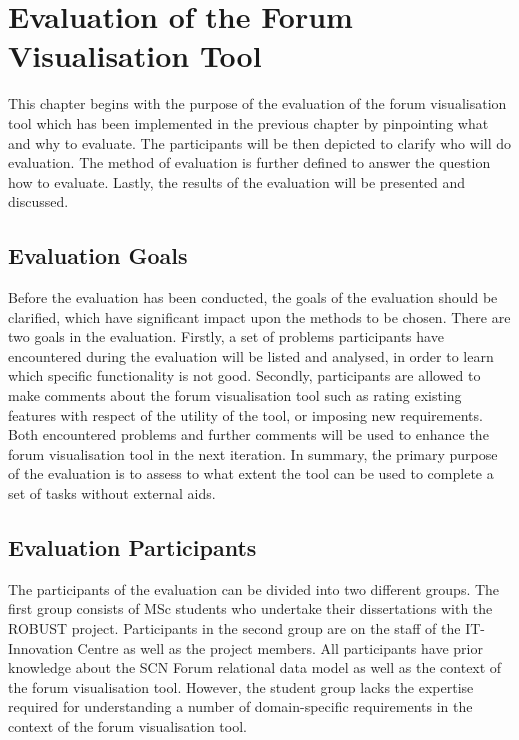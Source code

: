 \chapter{Evaluation of the Forum Visualisation Tool} \label{Chapter:Evaluation}

This chapter begins with the purpose of the evaluation of the forum visualisation tool which has been implemented in the previous chapter by pinpointing what and why to evaluate. The participants will be then depicted to clarify who will do evaluation. The method of evaluation is further defined to answer the question how to evaluate. Lastly, the results of the evaluation will be presented and discussed.

\section{Evaluation Goals}
Before the evaluation has been conducted, the goals of the evaluation should be clarified, which have significant impact upon the methods to be chosen. There are two goals in the evaluation. Firstly, a set of problems participants have encountered during the evaluation will be listed and analysed, in order to learn which specific functionality is not good. Secondly, participants are allowed to make comments about the forum visualisation tool such as rating existing features with respect of the utility of the tool, or imposing new requirements. Both encountered problems and further comments will be used to enhance the forum visualisation tool in the next iteration. In summary, the primary purpose of the evaluation is to assess to what extent the tool can be used to complete a set of tasks without external aids.

\section{Evaluation Participants}
The participants of the evaluation can be divided into two different groups. The first group consists of MSc students who undertake their dissertations with the ROBUST project. Participants in the second group are on the staff of the IT-Innovation Centre as well as the project members. All participants have prior knowledge about the SCN Forum relational data model as well as the context of the forum visualisation tool. However, the student group lacks the expertise required for understanding a number of domain-specific requirements in the context of the forum visualisation tool.

